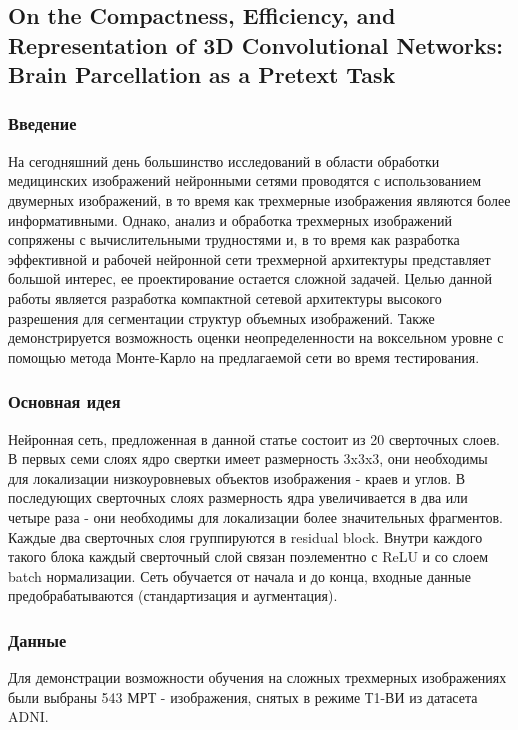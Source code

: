 \subsection*{On the Compactness, Efficiency, and Representation of 3D Convolutional Networks: Brain Parcellation as a Pretext Task}

\subsubsection*{Введение}
На сегодняшний день большинство исследований в области обработки медицинских 
изображений нейронными сетями проводятся с использованием двумерных изображений, в то время как 
трехмерные изображения являются более информативными. Однако, анализ и обработка трехмерных изображений сопряжены 
с вычислительными трудностями и, в то время как разработка эффективной и рабочей нейронной сети 
трехмерной архитектуры представляет большой интерес, ее проектирование остается сложной задачей.
 Целью данной работы является разработка компактной сетевой архитектуры высокого разрешения для сегментации 
 структур объемных изображений. Также демонстрируется возможность оценки неопределенности на воксельном уровне 
 с помощью метода Монте-Карло на предлагаемой сети во время тестирования. \par
\subsubsection*{Основная идея}
Нейронная сеть, предложенная в данной статье \cite{ann3} состоит из 20 сверточных слоев.
 В первых семи слоях ядро свертки имеет размерность 3x3x3, они необходимы для 
 локализации низкоуровневых объектов изображения - краев и углов. В последующих сверточных 
 слоях размерность ядра увеличивается в два или четыре раза - они необходимы для локализации 
 более значительных фрагментов. Каждые два сверточных слоя группируются в residual block. 
 Внутри каждого такого блока каждый сверточный слой связан поэлементно с ReLU и со слоем batch нормализации. 
 Сеть обучается от начала и до конца, входные данные предобрабатываются (стандартизация и аугментация). \par
\subsubsection*{Данные}
Для демонстрации возможности обучения на сложных трехмерных изображениях были выбраны 543 МРТ - 
изображения, снятых в режиме Т1-ВИ из датасета ADNI. \par
